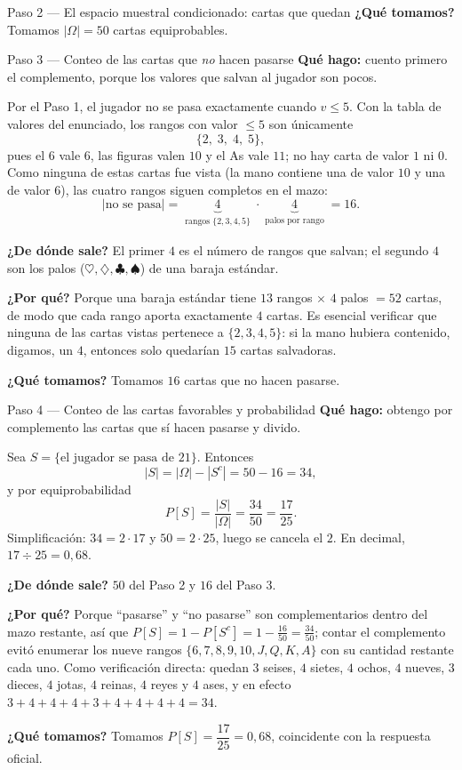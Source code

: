 \documentclass[11pt]{article}
\begin{document}
\begin{sol}
\begin{paso}{Paso 2 --- El espacio muestral condicionado: cartas que quedan}
\textbf{¿Qu\'e tomamos?} Tomamos $|\Omega|=50$ cartas equiprobables.
\end{paso}

\begin{paso}{Paso 3 --- Conteo de las cartas que \emph{no} hacen pasarse}
\textbf{Qu\'e hago:} cuento primero el complemento, porque los valores que salvan al jugador son pocos.

Por el Paso 1, el jugador no se pasa exactamente cuando $v\le 5$. Con la tabla de valores del enunciado, los rangos con valor $\le 5$ son \'unicamente
\[
\{2,\;3,\;4,\;5\},
\]
pues el $6$ vale $6$, las figuras valen $10$ y el As vale $11$; no hay carta de valor $1$ ni $0$. Como ninguna de estas cartas fue vista (la mano contiene una de valor $10$ y una de valor $6$), las cuatro rangos siguen completos en el mazo:
\[
|\text{no se pasa}|
=\underbrace{4}_{\substack{\text{rangos } \{2,3,4,5\}}}\cdot
\underbrace{4}_{\substack{\text{palos por rango}}}
=16 .
\]

\textbf{¿De d\'onde sale?} El primer $4$ es el n\'umero de rangos que salvan; el segundo $4$ son los palos ($\heartsuit,\diamondsuit,\clubsuit,\spadesuit$) de una baraja est\'andar.

\textbf{¿Por qu\'e?} Porque una baraja est\'andar tiene $13$ rangos $\times$ $4$ palos $=52$ cartas, de modo que cada rango aporta exactamente $4$ cartas. Es esencial verificar que ninguna de las cartas vistas pertenece a $\{2,3,4,5\}$: si la mano hubiera contenido, digamos, un $4$, entonces solo quedar\'ian $15$ cartas salvadoras.

\textbf{¿Qu\'e tomamos?} Tomamos $16$ cartas que no hacen pasarse.
\end{paso}

\begin{paso}{Paso 4 --- Conteo de las cartas favorables y probabilidad}
\textbf{Qu\'e hago:} obtengo por complemento las cartas que s\'i hacen pasarse y divido.

Sea $S=\{\text{el jugador se pasa de } 21\}$. Entonces
\[
|S|=|\Omega|-|S^{c}|=50-16=34,
\]
y por equiprobabilidad
\[
P[S]=\frac{|S|}{|\Omega|}=\frac{34}{50}=\frac{17}{25}.
\]
Simplificaci\'on: $34=2\cdot 17$ y $50=2\cdot 25$, luego se cancela el $2$. En decimal, $17\div 25=0{,}68$.

\textbf{¿De d\'onde sale?} $50$ del Paso 2 y $16$ del Paso 3.

\textbf{¿Por qu\'e?} Porque ``pasarse'' y ``no pasarse'' son complementarios dentro del mazo restante, as\'i que $P[S]=1-P[S^{c}]=1-\frac{16}{50}=\frac{34}{50}$; contar el complemento evit\'o enumerar los nueve rangos $\{6,7,8,9,10,J,Q,K,A\}$ con su cantidad restante cada uno. Como verificaci\'on directa: quedan $3$ seises, $4$ sietes, $4$ ochos, $4$ nueves, $3$ dieces, $4$ jotas, $4$ reinas, $4$ reyes y $4$ ases, y en efecto $3+4+4+4+3+4+4+4+4=34$.

\textbf{¿Qu\'e tomamos?} Tomamos $P[S]=\dfrac{17}{25}=0{,}68$, coincidente con la respuesta oficial.
\end{paso}

\end{sol}
\end{document}
